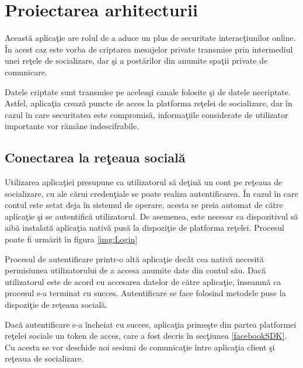 \chapter{Proiectarea arhitecturii}

Aceast\u{a} aplica\c{t}ie are rolul de a aduce un plus de securitate interac\c{t}iunilor online. \^{I}n acest caz este vorba de criptarea mesajelor private transmise prin intermediul unei re\c{t}ele de socializare, dar \c{s}i a post\u{a}rilor din anumite spa\c{t}ii private de comunicare.

Datele criptate sunt transmise pe acelea\c{s}i canale folosite \c{s}i de datele necriptate. Astfel, aplica\c{t}ia creaz\u{a} puncte de acces la platforma re\c{t}elei de socializare, dar \^{i}n cazul \^{i}n care securitatea este compromis\u{a}, informa\c{t}iile considerate de utilizator importante vor r\u{a}m\^{a}ne indescifrabile.


\section{Conectarea la re\c{t}eaua social\u{a}}

Utilizarea aplica\c{t}iei presupune ca utilizatorul s\u{a} de\c{t}in\u{a} un cont pe re\c{t}eaua de socializare, cu ale c\u{a}rui creden\c{t}iale se poate realiza autentificarea. \^{I}n cazul \^{i}n care contul este setat deja \^{i}n sistemul de operare, acesta se preia automat de c\u{a}tre aplica\c{t}ie \c{s}i se autentific\u{a} utilizatorul. De asemenea, este necesar ca dispozitivul s\u{a} aib\u{a} instalat\u{a} aplica\c{t}ia nativ\u{a} pus\u{a} la dispozi\c{t}ie de platforma re\c{t}elei. Procesul poate fi urm\u{a}rit \^{i}n figura \ref{img:Login}


Procesul de autentificare printr-o alt\u{a} aplica\c{t}ie dec\^{a}t cea nativ\u{a} necesit\u{a} permisiunea utilizatorului de a accesa anumite date din contul s\u{a}u. Dac\u{a} utilizatorul este de acord cu accesarea datelor de c\u{a}tre aplica\c{t}ie, \^{i}nseamn\u{a} ca procesul s-a terminat cu succes. Autentificare se face folosind metodele puse la dispozi\c{t}ie de re\c{t}eaua social\u{a}.

Dac\u{a} autentificare s-a \^{i}ncheiat cu succes, aplica\c{t}ia prime\c{s}te din partea platformei re\c{t}elei sociale un token de acces, care a fost decris \^{i}n sec\c{t}iunea \ref{facebookSDK}. Cu acesta se vor deschide noi sesiuni de comunica\c{t}ie \^{i}ntre aplica\c{t}ia client \c{s}i re\c{t}eaua de socializare.

